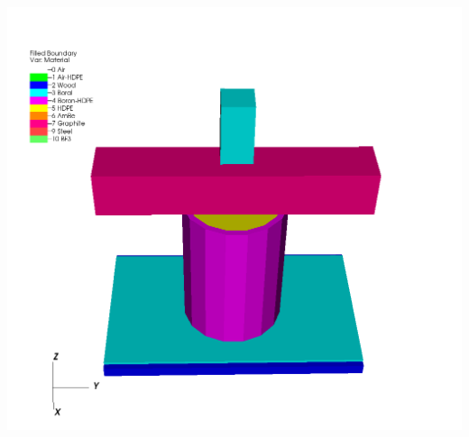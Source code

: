 \noindent\begin{minipage}{\textwidth}
\centering
\includegraphics[scale = 0.5]{figures/IM1_3D.png}
\label{IM13D}
\end{minipage}
\smallskip

